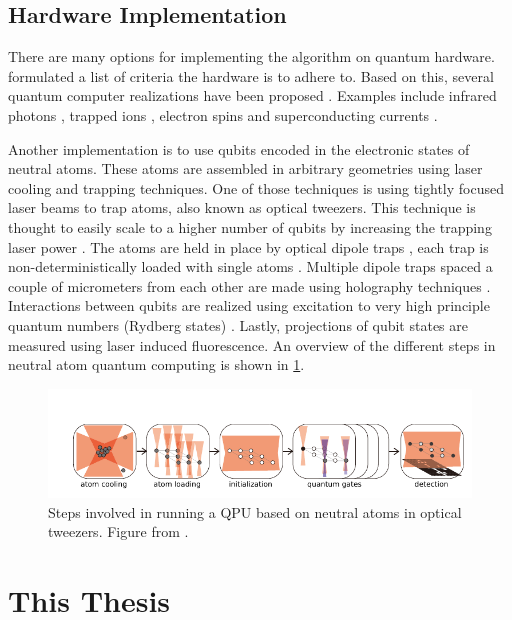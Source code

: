 \subsection{Hardware Implementation}

There are many options for implementing the algorithm on quantum hardware. \cite{DiVincenzo2000} formulated a list of criteria the hardware is to adhere to. Based on this, several quantum computer realizations have been proposed \cite{Ladd2010}. Examples include infrared photons \cite{Matthews2009},  trapped ions \cite{Benhelm2008,Schindler2013}, electron spins \cite{Press2008} and superconducting currents \cite{DiCarlo2009,Arute2019}. 

Another implementation is to use qubits encoded in the electronic states of neutral atoms. These atoms are assembled in arbitrary geometries using laser cooling and trapping techniques. One of those techniques is using tightly focused laser beams to trap atoms, also known as optical tweezers. This technique is thought to easily scale to a higher number of qubits by increasing the trapping laser power \cite{Henriet2020}. The atoms are held in place by optical dipole traps \cite{Chu1986}, each trap is non-deterministically loaded with single atoms \cite{Schlosser2001}. Multiple dipole traps spaced a couple of micrometers from each other are made using holography techniques \cite{Bergamini2004}. Interactions between qubits are realized using excitation to very high principle quantum numbers (Rydberg states) \cite{Levine2018,Madjarov2020}. Lastly, projections of qubit states are measured using laser induced fluorescence. An overview of the different steps in neutral atom quantum computing is shown in \cref{fig:ComputingSteps}.

\begin{figure}
	\centering
	\includegraphics[width=\linewidth]{figures/ComputingSteps.pdf}
	\caption{Steps involved in running a \ac{QPU} based on neutral atoms in optical tweezers. Figure from \cite{Wu2021}.}
	\label{fig:ComputingSteps}
\end{figure}

\section{This Thesis}

